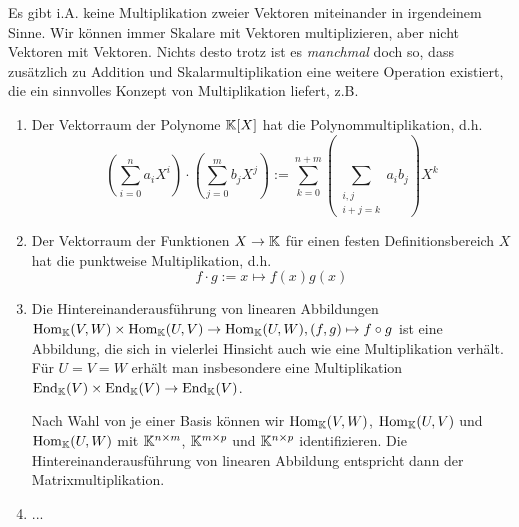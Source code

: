 \begin{remark}
	Es gibt i.A. keine Multiplikation zweier Vektoren miteinander in irgendeinem Sinne. Wir können immer Skalare mit Vektoren multiplizieren, aber nicht Vektoren mit Vektoren. Nichts desto trotz ist es \emph{manchmal} doch so, dass zusätzlich zu Addition und Skalarmultiplikation eine weitere Operation existiert, die ein sinnvolles Konzept von Multiplikation liefert, z.B.
	\begin{enumerate}
		\item Der Vektorraum der Polynome $\mathbb{K}[X]$ hat die Polynommultiplikation, d.h.
		\[\left(\sum_{i=0}^n a_i X^i\right) \cdot \left(\sum_{j=0}^m b_j X^j\right) := \sum_{k=0}^{n+m} (\sum_{\substack{i,j \\ i+j=k}} a_i b_j) X^k\]
		\item Der Vektorraum der Funktionen $X\to\mathbb{K}$ für einen festen Definitionsbereich $X$ hat die punktweise Multiplikation, d.h.
		\[f\cdot g := x\mapsto f(x)g(x)\]
		\item Die Hintereinanderausführung von linearen Abbildungen $\operatorname{Hom}_{\mathbb{K}}(V,W) \times \operatorname{Hom}_{\mathbb{K}}(U,V) \to \operatorname{Hom}_{\mathbb{K}}(U,W), (f,g) \mapsto f\circ g$ ist eine Abbildung, die sich in vielerlei Hinsicht auch wie eine Multiplikation verhält. Für $U=V=W$ erhält man insbesondere eine Multiplikation $\operatorname{End}_{\mathbb{K}}(V) \times \operatorname{End}_{\mathbb{K}}(V) \to \operatorname{End}_{\mathbb{K}}(V)$.
		
		Nach Wahl von je einer Basis können wir $\operatorname{Hom}_{\mathbb{K}}(V,W)$, $\operatorname{Hom}_{\mathbb{K}}(U,V)$ und $\operatorname{Hom}_{\mathbb{K}}(U,W)$ mit $\mathbb{K}^{n\times m}$, $\mathbb{K}^{m\times p}$ und $\mathbb{K}^{n\times p}$ identifizieren. Die Hintereinanderausführung von linearen Abbildung entspricht dann der Matrixmultiplikation.
		\item ...
	\end{enumerate}
	
\end{remark}


